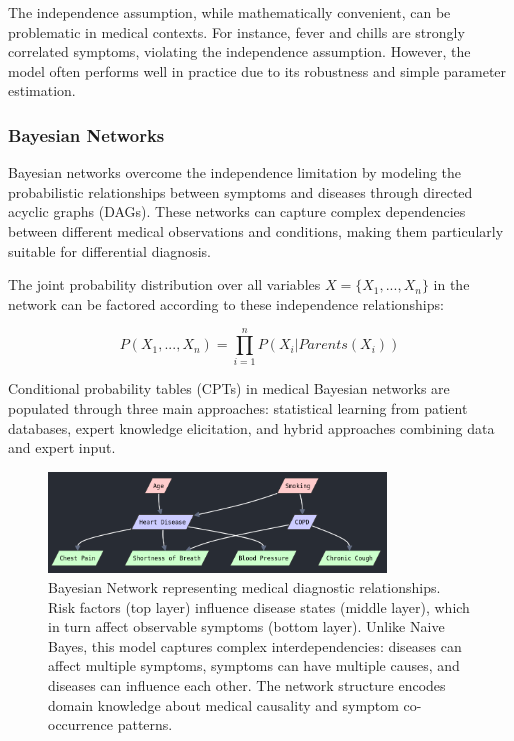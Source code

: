 \documentclass[3p,times,procedia]{elsarticle}
\begin{document}
The independence assumption, while mathematically convenient, can be problematic in medical contexts. For instance, fever and chills are strongly correlated symptoms, violating the independence assumption. However, the model often performs well in practice due to its robustness and simple parameter estimation.

\subsubsection{Bayesian Networks}
Bayesian networks overcome the independence limitation by modeling the
probabilistic relationships between symptoms and diseases through directed
acyclic graphs (DAGs). These networks can capture complex dependencies between
different medical observations and conditions, making them particularly
suitable for differential diagnosis.

The joint probability distribution over all variables $X = \{X_1, ..., X_n\}$
in the network can be factored according to these independence relationships:

\begin{equation}
P(X_1, ..., X_n) = \prod_{i=1}^{n} P(X_i|Parents(X_i))
\label{eq:bayesian_network}
\end{equation}

Conditional probability tables (CPTs) in medical Bayesian networks are populated through three main approaches:
statistical learning from patient databases, expert knowledge elicitation, and hybrid approaches
combining data and expert input.

\begin{figure}[h]
\centering
\includegraphics[width=0.8\textwidth]{figs/bayesian_network.png}
\caption{Bayesian Network representing medical diagnostic relationships. Risk factors (top layer) influence disease states (middle layer), which in turn affect observable symptoms (bottom layer). Unlike Naive Bayes, this model captures complex interdependencies: diseases can affect multiple symptoms, symptoms can have multiple causes, and diseases can influence each other. The network structure encodes domain knowledge about medical causality and symptom co-occurrence patterns.}
\label{fig:bayesian_network}
\end{figure}
\end{document}

